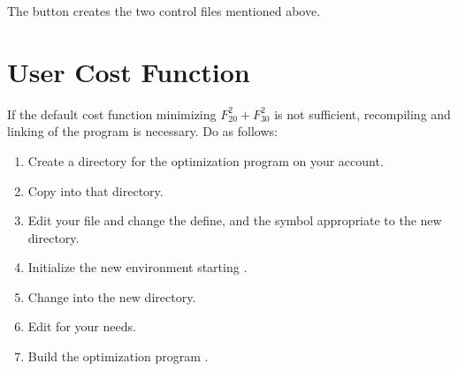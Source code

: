 The  button creates the two  control files mentioned above.

\section {User Cost Function}    
If the default cost function minimizing $F_{20}^2 + F_{30}^2$
is not sufficient, recompiling and linking of the program is necessary.
Do as follows:
\begin {enumerate}    
\item Create a directory for the optimization program on your account.
\item Copy  into that directory.
\item Edit your  file and change the   
define,
and the  symbol appropriate to the new directory.
\item Initialize the new environment starting . 
\item Change into the new directory.
\item Edit  for your needs. 
\item Build the optimization program .
\end {enumerate}    

